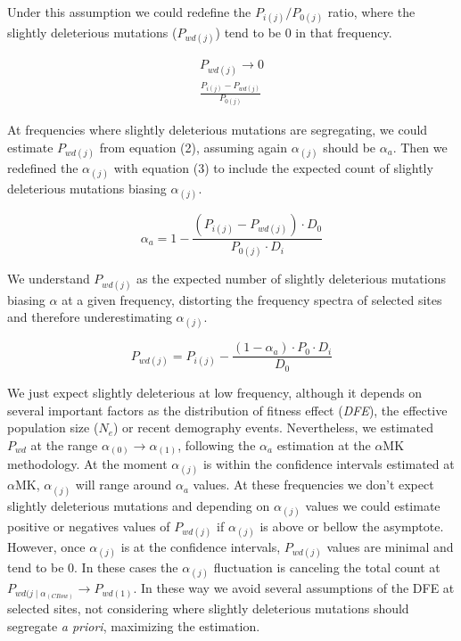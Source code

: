 \documentclass[11pt]{article}
\begin{document}
Under this assumption we could redefine the $P_{i(j)}/P_{0(j)}$ ratio, where the slightly deleterious mutations ($P_{wd(j)}$) tend to be 0 in that frequency.

\begin{equation}
	\begin{gathered}
		P_{wd(j)} \to 0\\
		\frac{P_{i(j)}-P_{wd(j)}}{P_{0(j)}}
	\end{gathered}
\end{equation}

At frequencies where slightly deleterious mutations are segregating, we could estimate $P_{wd(j)}$ from equation (2), assuming again $\alpha_{(j)}$ should be $\alpha_{a}$. Then we redefined the $\alpha_{(j)}$ with equation (3) to include the expected count of slightly deleterious mutations biasing $\alpha_{(j)}$.

\begin{equation}
	 \alpha_{a} = 1 - \frac{(P_{i(j)}-P_{wd(j)}) \cdot D_{0}}{P_{0(j)} \cdot D_{i}}
\end{equation}

We understand $P_{wd(j)}$ as the expected number of slightly deleterious mutations biasing $\alpha$ at a given frequency, distorting the frequency spectra of selected sites and therefore underestimating $\alpha_{(j)}$.

\begin{equation}
	 P_{wd(j)} = P_{i(j)} - \frac{(1-\alpha_{a}) \cdot P_{0} \cdot D_{i}}{D_{0}}
\end{equation}

We just expect slightly deleterious at low frequency, although it depends on several important factors as the distribution of 	fitness effect (\emph{DFE}), the effective population size ($N_{e}$) or recent demography events. Nevertheless, we estimated $P_{wd}$ at the range $\alpha_{(0)} \to \alpha_{(1)}$, following the $\alpha_{a}$ estimation at the $\alpha$MK methodology. At the moment $\alpha_{(j)}$ is within the confidence intervals estimated at $\alpha$MK, $\alpha_{(j)}$ will range around $\alpha_{a}$ values. At these frequencies we don't expect slightly deleterious mutations and depending on $\alpha_{(j)}$ values we could estimate positive or negatives values of $P_{wd(j)}$ if $\alpha_{(j)}$ is above or bellow the asymptote. However, once $\alpha_{(j)}$ is at the confidence intervals, $P_{wd(j)}$ values are minimal and tend to be 0. In these cases the $\alpha_{(j)}$ fluctuation is canceling the total count at $P_{wd(j \mid \alpha_{(CI low)}} \to P_{wd(1)}$. In these way we avoid several assumptions of the DFE at selected sites, not considering where slightly deleterious mutations should segregate \emph{a priori}, maximizing the estimation.
\end{document}
